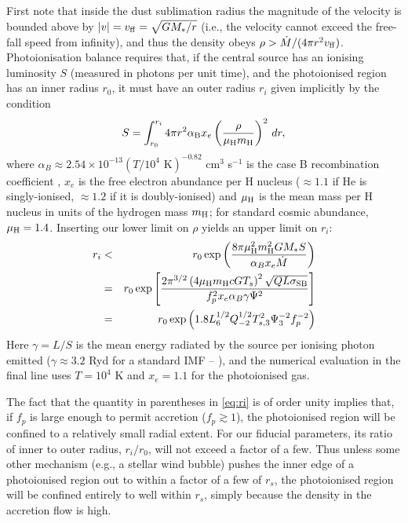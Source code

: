 \documentclass[useAMS,usenatbib]{mn2e}
\begin{document}
First note that inside the dust sublimation radius the magnitude of the velocity is bounded above by $|v| = v_{\rm ff} = \sqrt{GM_*/r}$ (i.e., the velocity cannot exceed the free-fall speed from infinity), and thus the density obeys $\rho > \dot{M}/(4\pi r^2 v_{\rm ff})$. Photoionisation balance requires that, if the central source has an ionising luminosity $S$ (measured in photons per unit time), and the photoionised region has an inner radius $r_0$, it must have an outer radius $r_i$ given implicitly by the condition
\begin{equation}
S = \int_{r_0}^{r_i} 4\pi r^2 \alpha_{\rm B} x_e \left(\frac{\rho}{\mu_{\rm H} m_{\rm H}}\right)^2 \, dr,
\end{equation}
where $\alpha_B \approx 2.54 \times 10^{-13} (T/10^4\mbox{ K})^{-0.82}$ cm$^3$ s$^{-1}$ is the case B recombination coefficient \citep{draine11a}, $x_e$ is the free electron abundance per H nucleus ($\approx 1.1$ if He is singly-ionised, $\approx 1.2$ if it is doubly-ionised) and $\mu_{\rm H}$ is the mean mass per H nucleus in units of the hydrogen mass $m_{\rm H}$; for standard cosmic abundance, $\mu_{\rm H} = 1.4$. Inserting our lower limit on $\rho$ yields an upper limit on $r_i$:
\begin{eqnarray}
r_i & < & r_0 \exp\left(\frac{8\pi \mu_{\rm H}^2 m_{\rm H}^2 G M_* S}{\alpha_B x_e \dot{M}}\right) \\
& = & r_0 \exp\left[\frac{2 \pi^{3/2} \left(4\mu_{\rm H} m_{\rm H} c G T_s\right)^2 \sqrt{Q L \sigma_{\rm SB}}}{f_p^2 x_e \alpha_B \gamma \Psi^2}\right] \\
& = & r_0 \exp\left(1.8 L_6^{1/2} Q_{-2}^{1/2} T_{s,3}^2 \Psi_3^{-2} f_p^{-2} \right)
\label{eq:ri}
\end{eqnarray}
Here $\gamma = L/S$ is the mean energy radiated by the source per ionising photon emitted ($\gamma \approx 3.2$ Ryd for a standard IMF -- \citealt{fall10a}), and the numerical evaluation in the final line uses $T = 10^4$ K and $x_e = 1.1$ for the photoionised gas.

The fact that the quantity in parentheses in \autoref{eq:ri} is of order unity implies that, if $f_p$ is large enough to permit accretion ($f_p \gtrsim 1$), the photoionised region will be confined to a relatively small radial extent. For our fiducial parameters, its ratio of inner to outer radius, $r_i/r_0$, will not exceed a factor of a few. Thus unless some other mechanism (e.g., a stellar wind bubble) pushes the inner edge of a photoionised region out to within a factor of a few of $r_s$, the photoionised region will be confined entirely to well within $r_s$, simply because the density in the accretion flow is high.
\end{document}
